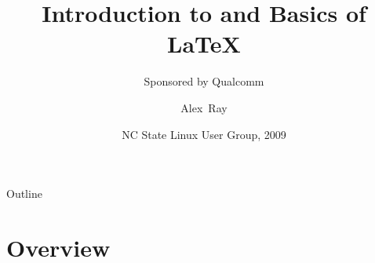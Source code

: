 \documentclass{beamer}
\title[Overview of \LaTeX] %
{Introduction to and Basics of \LaTeX}
\subtitle
{Sponsored by Qualcomm}
\author[Alex Ray] %
{Alex~Ray\inst{1}}
\institute[North Carolina State University] %
{
  \inst{1}%
  College of Textiles\\
  North Carolina State University}
\date[NCSU LUG 2009] %
{NC State Linux User Group, 2009}
\begin{document}
\begin{frame}
  \titlepage
\end{frame}

\begin{frame}{Outline}
  \tableofcontents
\end{frame}





\section{Overview}
\end{document}
